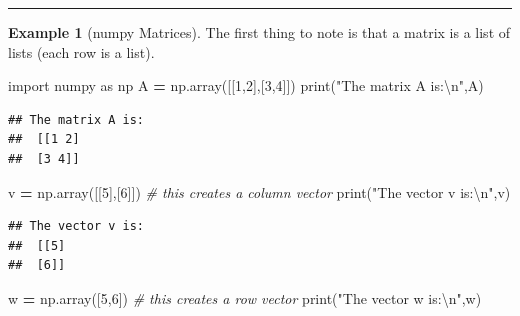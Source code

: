 \documentclass[
]{book}
\newenvironment{Shaded}{\begin{snugshade}}{\end{snugshade}}
\newcommand{\BuiltInTok}[1]{#1}
\newcommand{\CharTok}[1]{\textcolor[rgb]{0.31,0.60,0.02}{#1}}
\newcommand{\CommentTok}[1]{\textcolor[rgb]{0.56,0.35,0.01}{\textit{#1}}}
\newcommand{\DecValTok}[1]{\textcolor[rgb]{0.00,0.00,0.81}{#1}}
\newcommand{\ImportTok}[1]{#1}
\newcommand{\NormalTok}[1]{#1}
\newcommand{\OperatorTok}[1]{\textcolor[rgb]{0.81,0.36,0.00}{\textbf{#1}}}
\newcommand{\StringTok}[1]{\textcolor[rgb]{0.31,0.60,0.02}{#1}}
\theoremstyle{definition}
\theoremstyle{definition}
\newtheorem{example}{Example}[chapter]
\theoremstyle{definition}
\theoremstyle{remark}
\begin{document}
\begin{center}\rule{0.5\linewidth}{0.5pt}\end{center}

\begin{example}[numpy Matrices]
\protect\hypertarget{exm:unnamed-chunk-712}{}{\label{exm:unnamed-chunk-712} {} }The first thing to note is that a matrix is a list of lists (each row is a list).
\end{example}

\begin{Shaded}
\begin{Highlighting}[]
\ImportTok{import}\NormalTok{ numpy }\ImportTok{as}\NormalTok{ np}
\NormalTok{A }\OperatorTok{=}\NormalTok{ np.array([[}\DecValTok{1}\NormalTok{,}\DecValTok{2}\NormalTok{],[}\DecValTok{3}\NormalTok{,}\DecValTok{4}\NormalTok{]])}
\BuiltInTok{print}\NormalTok{(}\StringTok{"The matrix A is:}\CharTok{\textbackslash{}n}\StringTok{"}\NormalTok{,A)}
\end{Highlighting}
\end{Shaded}

\begin{verbatim}
## The matrix A is:
##  [[1 2]
##  [3 4]]
\end{verbatim}

\begin{Shaded}
\begin{Highlighting}[]
\NormalTok{v }\OperatorTok{=}\NormalTok{ np.array([[}\DecValTok{5}\NormalTok{],[}\DecValTok{6}\NormalTok{]]) }\CommentTok{\# this creates a column vector}
\BuiltInTok{print}\NormalTok{(}\StringTok{"The vector v is:}\CharTok{\textbackslash{}n}\StringTok{"}\NormalTok{,v)}
\end{Highlighting}
\end{Shaded}

\begin{verbatim}
## The vector v is:
##  [[5]
##  [6]]
\end{verbatim}

\begin{Shaded}
\begin{Highlighting}[]
\NormalTok{w }\OperatorTok{=}\NormalTok{ np.array([}\DecValTok{5}\NormalTok{,}\DecValTok{6}\NormalTok{]) }\CommentTok{\# this creates a row vector}
\BuiltInTok{print}\NormalTok{(}\StringTok{"The vector w is:}\CharTok{\textbackslash{}n}\StringTok{"}\NormalTok{,w)}
\end{Highlighting}
\end{Shaded}
\end{document}

